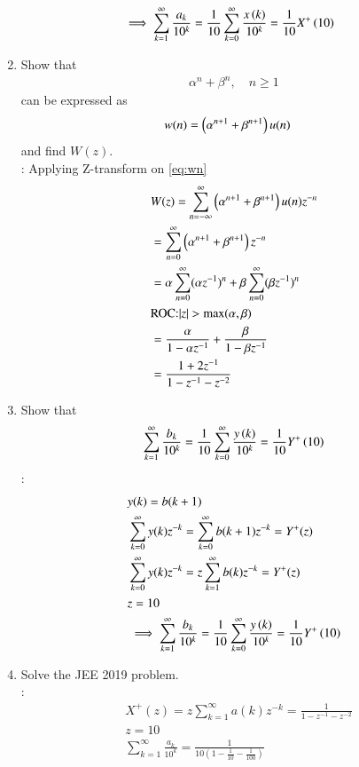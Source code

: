 \documentclass[journal,12pt,twocolumn]{IEEEtran}
\renewcommand\thesection{\arabic{section}}
\begin{document}
\begin{enumerate}[label=\thesection.\arabic*,ref=\thesection.\theenumi]
\begin{align}
	&\implies \sum_{k=1}^{\infty}\frac{a_k}{10^k}= 
	\frac{1}{10}\sum_{k=0}^{\infty}\frac{x\left(k\right)}{10^k} =\frac{1}{10}X^{+}\left({10}\right)
\end{align}
\item Show that 
\begin{align}
	\alpha^n + \beta^n, \quad n \ge 1
\end{align}
can be expressed as 
\begin{align}
	\label{eq:wn}
	&w(n) =\left(\alpha^{n+1} + \beta^{n+1}\right)u(n)
\end{align}
and find $W(z)$.\\
\solution:
Applying Z-transform on \ref{eq:wn}
\begin{align}
	&W(z)=\sum_{n=-\infty}^{\infty}\brak{\alpha^{n+1} + \beta^{n+1}}u(n)z^{-n}\\
	&=\sum_{n=0}^{\infty}\brak{\alpha^{n+1} + \beta^{n+1}}z^{-n}\\
	&=\alpha \sum_{n=0}^{\infty}(\alpha z^{-1})^{n}+\beta \sum_{n=0}^{\infty} (\beta z^{-1})^{n}\\
	&\text{ROC:} |z|>\text{max}(\alpha,\beta)\\
	&=\frac{\alpha}{1-\alpha z^{-1}}+\frac{\beta}{1-\beta z^{-1}}\\
	&=\frac{1+2z^{-1}}{1-z^{-1}-z^{-2}}
\end{align}
\item Show that 
\begin{align}
	\sum_{k=1}^{\infty}\frac{b_k}{10^k} =
	\frac{1}{10}\sum_{k=0}^{\infty}\frac{y\left(k\right)}{10^k} =\frac{1}{10}Y^{+}\left({10}\right)
\end{align}
\solution:
\begin{align}
	&y(k)=b(k+1)\\
	&\sum_{k=0}^{\infty} y(k) z^{-k}=\sum_{k=0}^{\infty} b(k+1) z^{-k}=Y^{+}(z)\\
	&\sum_{k=0}^{\infty} y(k) z^{-k}=z\sum_{k=1}^{\infty} b(k) z^{-k}=Y^{+}(z)\\
	&z=10\\
	&\implies \sum_{k=1}^{\infty}\frac{b_k}{10^k} =
	\frac{1}{10}\sum_{k=0}^{\infty}\frac{y\left(k\right)}{10^k} =\frac{1}{10}Y^{+}\left({10}\right)
\end{align}
\item Solve the JEE 2019 problem.\\
\solution:
\begin{align}
	&X^{+}(z)=z\sum_{k=1}^{\infty} a(k) z^{-k}=\frac{1}{1-z^{-1}-z^{-2}}\\
	&z=10\\
	&\sum_{k=1}^{\infty} \frac{a_k}{10^k}=\frac{1}{10 \left(1-\frac{1}{10}-\frac{1}{100}\right)}\\

\end{align}
\end{enumerate}
\end{document}
